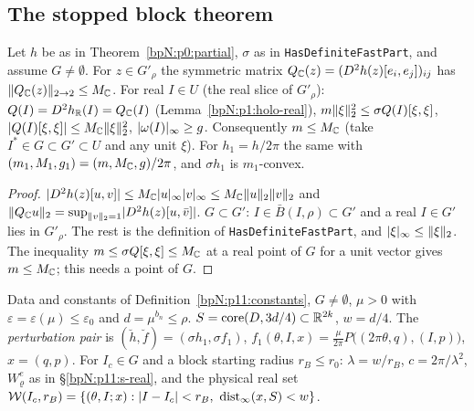 \subsection{The stopped block theorem}\label{bpN:p11:s-block}

\begin{lemma}\label{bpN:p11:hessian}
Let $h$ be as in Theorem~\ref{bpN:p0:partial}, $\sigma$ as in \texttt{HasDefiniteFastPart}, and assume $G\ne\emptyset$. For $z\in G'_\rho$ the symmetric matrix $Q_{\mathbb{C}}(z)=(D^2h(z)[e_i,e_j])_{ij}$ has $\lVert Q_{\mathbb{C}}(z)\rVert_{2\to2}\le M_{\mathbb{C}}$. For real $I\in U$ (the real slice of $G'_\rho$): $Q(I)=D^2h_{\mathbb{R}}(I)=Q_{\mathbb{C}}(I)$ (Lemma~\ref{bpN:p1:holo-real}), $m\lVert \xi\rVert_2^2\le\sigma Q(I)[\xi,\xi]$, $\lvert Q(I)[\xi,\xi]\rvert\le M_{\mathbb{C}}\lVert \xi\rVert_2^2$, $\lvert \omega(I)\rvert_\infty\ge g$. Consequently $m\le M_{\mathbb{C}}$ (take $I^*\in G\subset G'\subset U$ and any unit $\xi$). For $h_1=h/2\pi$ the same with $(m_1,M_1,g_1)=(m,M_{\mathbb{C}},g)/2\pi$, and $\sigma h_1$ is $m_1$-convex.
\end{lemma}
\begin{proof}
\label{stepN:p11:hs-op} $\lvert D^2h(z)[u,v]\rvert\le M_{\mathbb{C}}\lvert u\rvert_\infty\lvert v\rvert_\infty\le M_{\mathbb{C}}\lVert u\rVert_2\lVert v\rVert_2$ and $\lVert Q_{\mathbb{C}}u\rVert_2=\sup_{\lVert v\rVert_2=1}\lvert D^2h(z)[u,\bar v]\rvert$. $G\subset G'$: $I\in\bar B(I,\rho)\subset G'$ and a real $I\in G'$ lies in $G'_\rho$. The rest is the definition of \texttt{HasDefiniteFastPart}, and $\lvert \xi\rvert_\infty\le\lVert \xi\rVert_2$. The inequality $m\le\sigma Q[\xi,\xi]\le M_{\mathbb{C}}$ at a real point of $G$ for a unit vector gives $m\le M_{\mathbb{C}}$; this needs a point of $G$.
\end{proof}

\begin{definition}\label{bpN:p11:block-setting}
Data and constants of Definition~\ref{bpN:p11:constants}, $G\ne\emptyset$, $\mu>0$ with $\varepsilon=\varepsilon(\mu)\le\varepsilon_0$ and $d=\mu^{b_n}\le\rho$. $S=\operatorname{core}(D,3d/4)\subset\mathbb{R}^{2k}$, $w=d/4$. The \emph{perturbation pair} is $(\breve h,\breve f)=(\sigma h_1,\sigma f_1)$, $f_1(\theta,I,x)=\frac\mu{2\pi}P\bigl((2\pi\theta,q),(I,p)\bigr)$, $x=(q,p)$. For $I_c\in G$ and a block starting radius $r_B\le r_0$: $\lambda=w/r_B$, $c=2\pi/\lambda^2$, $W^e_\varrho$ as in \S\ref{bpN:p11:s-real}, and the physical real set $\mathcal W(I_c,r_B)=\{(\theta,I;x):\abs{I-I_c}<r_B,\ \operatorname{dist}_\infty(x,S)<w\}$.
\end{definition}

